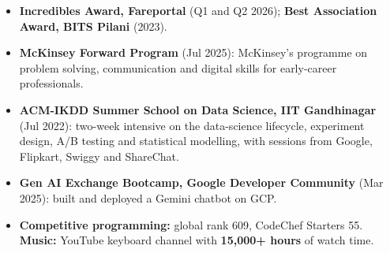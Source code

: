 \documentclass[a4paper,10pt]{extarticle}
\begin{document}
\begin{itemize}
    \item \textbf{Incredibles Award, Fareportal} (Q1 and Q2 2026); \textbf{Best Association Award, BITS
    Pilani} (2023).

    \item \textbf{McKinsey Forward Program} (Jul 2025): McKinsey's programme on problem solving,
    communication and digital skills for early-career professionals.

    \item \textbf{ACM-IKDD Summer School on Data Science, IIT Gandhinagar} (Jul 2022): two-week
    intensive on the data-science lifecycle, experiment design, A/B testing and statistical modelling,
    with sessions from Google, Flipkart, Swiggy and ShareChat.

    \item \textbf{Gen AI Exchange Bootcamp, Google Developer Community} (Mar 2025): built and deployed a
    Gemini chatbot on GCP.

    \item \textbf{Competitive programming:} global rank 609, CodeChef Starters 55. \textbf{Music:}
    YouTube keyboard channel with \textbf{15,000+ hours} of watch time.
\end{itemize}
\end{document}

